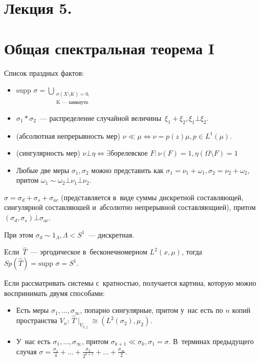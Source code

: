 \documentclass{article}
\begin{document}
\section*{Лекция 5. }
\resetcntrs

\section{Общая спектральная теорема I}

Список праздных фактов:
\begin{itemize}
	\item $\text{supp }\sigma = \bigcup\limits_{\substack{ \sigma(X
		\setminus K) = 0,\\\text{K~--- замкнуто}}}$
	\item $\sigma_1 \ast \sigma_2$~--- распределение случайной величины~$\xi_1 +
		\xi_2, \xi_1 \bot \xi_2$.
	\item (абсолютная непрерывность мер) $\nu \ll \mu \Leftrightarrow \nu = p(z)
		\mu, p \in L^1(\mu)$.
	\item (сингулярность мер) $\nu \bot \eta \Leftrightarrow \exists $борелевское
		$F: \nu(F) = 1, \eta(\Omega \setminus F) = 1$
	\item Любые две меры $\sigma_1, \sigma_2$ можно представить как $\sigma_1 =
		\nu_1 + \omega_1, \sigma_2 = \nu_2 + \omega_2$, притом $\omega_1 \sim
		\omega_2 \bot \nu_1 \bot \nu_2$.
\end{itemize}

\begin{theorem}
	$\sigma = \sigma_d + \sigma_s + \sigma_{ac}$ (представляется
	в~виде суммы дискретной составляющей, сингулярной составляюшей и~абсолютно
	непрерывной составляющией), притом $(\sigma_d, \sigma_s) \bot \sigma_{ac}$.

	При этом $\sigma_d \sim 1_\Lambda, \Lambda < S^1$~--- дискретная.
\end{theorem}

\begin{theorem}[$\ast$]
	Если~$\hat T$~--- эргодическое в~бесконечномерном $L^2(x, \mu)$, тогда
	$Sp(\hat T) = \text{supp }\sigma = S^1$.
\end{theorem}

Если рассматривать системы с~кратностью, получается картина, которую можно
воспринимать двумя способами:
\begin{itemize}
	\item Есть меры $\sigma_1, \ldots, \sigma_{\infty}$, попарно сингулярные,
		притом у~нас есть по $n$ копий пространства $V_n$: $\hat T\mid_{V_{2,j}}
		\cong (L^2(\sigma_2), \mu_2)$.
	\item У~нас есть $\sigma_1, \ldots, \sigma_{\infty}$, притом $\sigma_{k+1} \ll
		\sigma_k, \sigma_1 = \sigma$. В~терминах предыдущего случая $\sigma =
		\frac{\sigma_1}{4} + \ldots + \frac{\sigma_k}{2^{k+1}} + \ldots +
		\frac{\sigma_\infty}{2}$.
\end{itemize}
\end{document}
